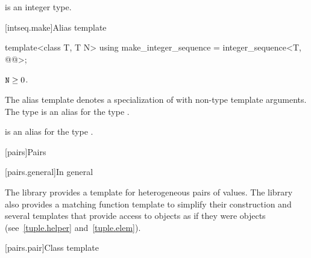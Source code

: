 \pnum
\mandates
{} is an integer type.

[intseq.make]{Alias template }

%
\begin{itemdecl}
template<class T, T N>
  using make_integer_sequence = integer_sequence<T, @\seebelow{}@>;
\end{itemdecl}

\begin{itemdescr}
\pnum
\mandates
$\texttt{N} \geq 0$.

\pnum
The alias template
 denotes a specialization of
 with  non-type template arguments.
The type  is an alias for the type
.
\begin{note}
 is an alias for the type
.
\end{note}
\end{itemdescr}

[pairs]{Pairs}

[pairs.general]{In general}

\pnum
The library provides a template for heterogeneous pairs of values.
The library also provides a matching function template to simplify
their construction and several templates that provide access to 
objects as if they were  objects (see~\ref{tuple.helper}
and~\ref{tuple.elem}).%
%
%
%

[pairs.pair]{Class template }

